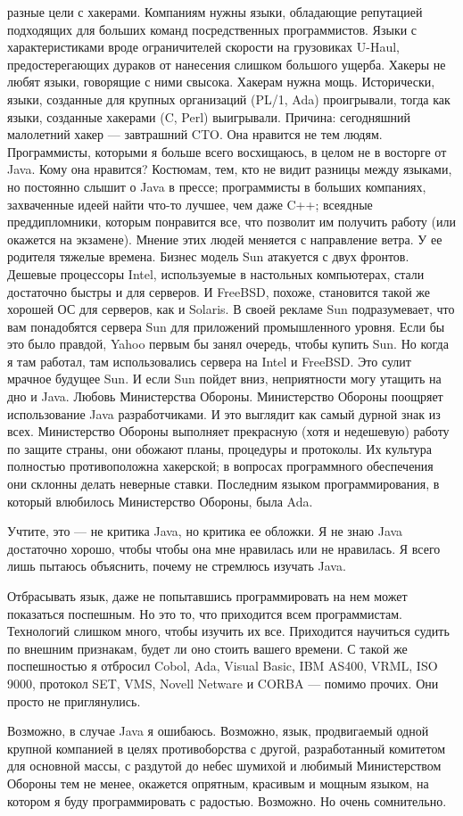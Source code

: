 \documentclass[ebook,12pt,oneside,openany]{memoir}
\begin{document}
разные цели с хакерами. Компаниям нужны языки, обладающие репутацией
подходящих для больших команд посредственных программистов. Языки с
характеристиками вроде ограничителей скорости на грузовиках U-Haul,
предостерегающих дураков от нанесения слишком большого ущерба. Хакеры
не любят языки, говорящие с ними свысока. Хакерам нужна мощь.
Исторически, языки, созданные для крупных организаций (PL/1, Ada)
проигрывали, тогда как языки, созданные хакерами (C, Perl) выигрывали.
Причина: сегодняшний малолетний хакер — завтрашний CTO. Она нравится
не тем людям. Программисты, которыми я больше всего восхищаюсь, в
целом не в восторге от Java. Кому она нравится? Костюмам, тем, кто не
видит разницы между языками, но постоянно слышит о Java в прессе;
программисты в больших компаниях, захваченные идеей найти что-то
лучшее, чем даже C++; всеядные преддипломники, которым понравится все,
что позволит им получить работу (или окажется на экзамене). Мнение
этих людей меняется с направление ветра. У ее родителя тяжелые
времена. Бизнес модель Sun атакуется с двух фронтов. Дешевые
процессоры Intel, используемые в настольных компьютерах, стали
достаточно быстры и для серверов. И FreeBSD, похоже, становится такой
же хорошей ОС для серверов, как и Solaris. В своей рекламе Sun
подразумевает, что вам понадобятся сервера Sun для приложений
промышленного уровня. Если бы это было правдой, Yahoo первым бы занял
очередь, чтобы купить Sun. Но когда я там работал, там использовались
сервера на Intel и FreeBSD. Это сулит мрачное будущее Sun. И если Sun
пойдет вниз, неприятности могу утащить на дно и Java. Любовь
Министерства Обороны. Министерство Обороны поощряет использование Java
разработчиками. И это выглядит как самый дурной знак из всех.
Министерство Обороны выполняет прекрасную (хотя и недешевую) работу по
защите страны, они обожают планы, процедуры и протоколы. Их культура
полностью противоположна хакерской; в вопросах программного
обеспечения они склонны делать неверные ставки. Последним языком
программирования, в который влюбилось Министерство Обороны, была Ada.

Учтите, это — не критика Java, но критика ее обложки. Я не знаю Java
достаточно хорошо, чтобы чтобы она мне нравилась или не нравилась. Я
всего лишь пытаюсь объяснить, почему не стремлюсь изучать Java.

Отбрасывать язык, даже не попытавшись программировать на нем может
показаться поспешным. Но это то, что приходится всем программистам.
Технологий слишком много, чтобы изучить их все. Приходится научиться
судить по внешним признакам, будет ли оно стоить вашего времени. С
такой же поспешностью я отбросил Cobol, Ada, Visual Basic, IBM AS400,
VRML, ISO 9000, протокол SET, VMS, Novell Netware и CORBA — помимо
прочих. Они просто не приглянулись.

Возможно, в случае Java я ошибаюсь. Возможно, язык, продвигаемый одной
крупной компанией в целях противоборства с другой, разработанный
комитетом для основной массы, с раздутой до небес шумихой и любимый
Министерством Обороны тем не менее, окажется опрятным, красивым и
мощным языком, на котором я буду программировать с радостью. Возможно.
Но очень сомнительно.
\end{document}
